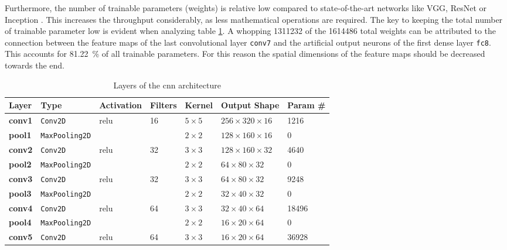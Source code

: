 Furthermore, the number of trainable parameters (weights) is relative low compared to state-of-the-art networks like VGG, ResNet or Inception \cite{training_arch_keras}.
This increases the throughput considerably, as less mathematical operations are required.
The key to keeping the total number of trainable parameter low is evident when analyzing table \ref{tab:arch}.
A whopping \num{1311232} of the \num{1614486} total weights can be attributed to the connection between the feature maps of the last convolutional layer \texttt{conv7} and the artificial output neurons of the first dense layer \texttt{fc8}.
This accounts for \SI{81.22}{\percent} of all trainable parameters.
For this reason the spatial dimensions of the feature maps should be decreased towards the end.

\begin{table}
  \caption{Layers of the \acrshort{cnn} architecture}
  \label{tab:arch}
  \centering
  \begin{tabular}{lllllll}
    \toprule
    \textbf{Layer} & \textbf{Type} & \textbf{Activation} & \textbf{Filters} & \textbf{Kernel} & \textbf{Output Shape} & \textbf{Param \#} \\
    \midrule
    \textbf{conv1} & \texttt{Conv2D} & \acrshort{relu} & \num{16} & $5\times 5$ & $256\times 320\times 16$ & \num{1216} \\
    \textbf{pool1} & \texttt{MaxPooling2D} &  &  & $2\times 2$ & $128\times 160\times 16$ & \num{0} \\
    \midrule
    \textbf{conv2} & \texttt{Conv2D} & \acrshort{relu} & \num{32} & $3\times 3$ & $128\times 160\times 32$ & \num{4640} \\
    \textbf{pool2} & \texttt{MaxPooling2D} &  &  & $2\times 2$ & $64\times 80\times 32$ & \num{0} \\
    \midrule
    \textbf{conv3} & \texttt{Conv2D} & \acrshort{relu} & \num{32} & $3\times 3$ & $64\times 80\times 32$ & \num{9248} \\
    \textbf{pool3} & \texttt{MaxPooling2D} &  &  & $2\times 2$ & $32\times 40\times 32$ & \num{0} \\
    \midrule
    \textbf{conv4} & \texttt{Conv2D} & \acrshort{relu} & \num{64} & $3\times 3$ & $32\times 40\times 64$ & \num{18496} \\
    \textbf{pool4} & \texttt{MaxPooling2D} &  &  & $2\times 2$ & $16\times 20\times 64$ & \num{0} \\
    \midrule
    \textbf{conv5} & \texttt{Conv2D} & \acrshort{relu} & \num{64} & $3\times 3$ & $16\times 20\times 64$ & \num{36928} \\

\end{tabular}
\end{table}
